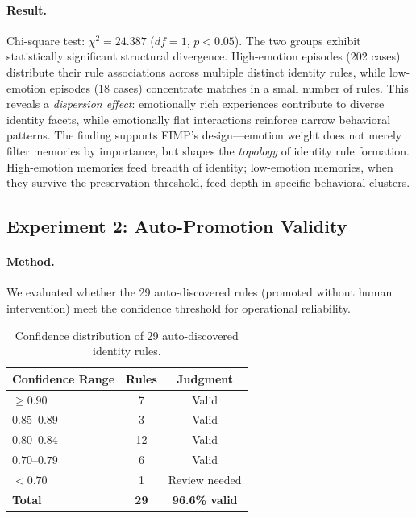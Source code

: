 \documentclass[11pt,a4paper]{article}
\begin{document}
\paragraph{Result.} Chi-square test: $\chi^2 = 24.387$ ($df = 1$, $p < 0.05$). The two
groups exhibit statistically significant structural divergence. High-emotion episodes
(202 cases) distribute their rule associations across multiple distinct identity rules,
while low-emotion episodes (18 cases) concentrate matches in a small number of rules.
This reveals a \emph{dispersion effect}: emotionally rich experiences contribute to
diverse identity facets, while emotionally flat interactions reinforce narrow behavioral
patterns. The finding supports FIMP's design---emotion weight does not merely filter
memories by importance, but shapes the \emph{topology} of identity rule formation.
High-emotion memories feed breadth of identity; low-emotion memories, when they survive
the preservation threshold, feed depth in specific behavioral clusters.

\subsection{Experiment 2: Auto-Promotion Validity}

\paragraph{Method.} We evaluated whether the 29 auto-discovered rules (promoted without
human intervention) meet the confidence threshold for operational reliability.

\begin{table}[h]
\centering
\caption{Confidence distribution of 29 auto-discovered identity rules.}
\label{tab:exp2}
\small
\begin{tabular}{@{}lcc@{}}
\toprule
\textbf{Confidence Range} & \textbf{Rules} & \textbf{Judgment} \\
\midrule
$\geq 0.90$    & 7  & Valid \\
$0.85$--$0.89$ & 3  & Valid \\
$0.80$--$0.84$ & 12 & Valid \\
$0.70$--$0.79$ & 6  & Valid \\
$< 0.70$       & 1  & Review needed \\
\midrule
\textbf{Total}  & \textbf{29} & \textbf{96.6\% valid} \\
\bottomrule
\end{tabular}
\end{table}
\end{document}

